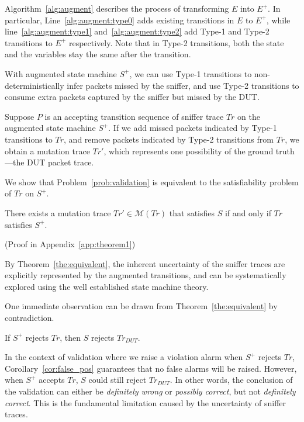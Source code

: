 Algorithm~\ref{alg:augment} describes the process of transforming $E$ into
$E^+$.  In particular, Line~\ref{alg:augment:type0} adds existing transitions in
$E$ to $E^+$, while line~\ref{alg:augment:type1} and~\ref{alg:augment:type2} add
Type-1 and Type-2 transitions to $E^+$ respectively. Note that in Type-2
transitions, both the state and the variables stay the same after the
transition.


With augmented state machine $S^+$, we can use Type-1 transitions to
non-deterministically infer packets missed by the sniffer, and use Type-2
transitions to consume extra
packets captured by the sniffer but missed by the DUT.

Suppose $P$ is an accepting transition sequence of sniffer trace $Tr$ on the
augmented state machine $S^+$. If we add missed packets indicated by Type-1
transitions to $Tr$, and remove packets indicated by Type-2 transitions from
$Tr$, we obtain a mutation trace $Tr'$, which represents one possibility of the
ground truth---the DUT packet trace.

We show that Problem~\ref{prob:validation} is equivalent to the
satisfiability problem of $Tr$ on $S^+$.

\begin{theorem}
  There exists a mutation trace $Tr' \in \mathcal{M}(Tr)$ that satisfies $S$ if
  and only if $Tr$ satisfies $S^+$.
 \label{the:equivalent}
\end{theorem}%
(Proof in Appendix~\ref{app:theorem1})

By Theorem~\ref{the:equivalent}, the inherent uncertainty of the sniffer traces
are explicitly represented by the augmented transitions, and can be
systematically explored using the well established state machine theory.

One immediate observation can be drawn from Theorem~\ref{the:equivalent} by
contradiction.

\begin{corollary}
  If $S^+$ rejects $Tr$, then $S$ rejects $Tr_{DUT}$.
  \label{cor:false_pos}
\end{corollary}
In the context of validation where we raise a violation alarm when $S^+$
rejects $Tr$, Corollary~\ref{cor:false_pos} guarantees that no false alarms will be
raised.
However, when $S^+$ accepts $Tr$, $S$ could still reject $Tr_{DUT}$.
In other words, the conclusion of the validation can either be \textit{definitely
wrong} or \textit{possibly correct}, but not \textit{definitely correct}.
This is the fundamental limitation caused by the uncertainty of sniffer traces.
